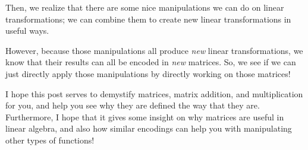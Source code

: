 \documentclass[]{article}
\begin{document}
Then, we realize that there are some nice manipulations we can do on linear
transformations; we can combine them to create new linear transformations in
useful ways.

However, because those manipulations all produce \emph{new} linear
transformations, we know that their results can all be encoded in \emph{new}
matrices. So, we see if we can just directly apply those manipulations by
directly working on those matrices!

I hope this post serves to demystify matrices, matrix addition, and
multiplication for you, and help you see why they are defined the way that they
are. Furthermore, I hope that it gives some insight on why matrices are useful
in linear algebra, and also how similar encodings can help you with manipulating
other types of functions!
\end{document}
